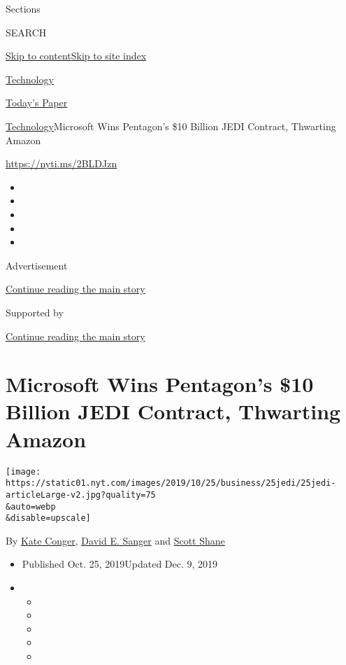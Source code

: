 Sections

SEARCH

\protect\hyperlink{site-content}{Skip to
content}\protect\hyperlink{site-index}{Skip to site index}

\href{https://www.nytimes.com/section/technology}{Technology}

\href{https://myaccount.nytimes.com/auth/login?response_type=cookie\&client_id=vi}{}

\href{https://www.nytimes.com/section/todayspaper}{Today's Paper}

\href{/section/technology}{Technology}\textbar{}Microsoft Wins
Pentagon's \$10 Billion JEDI Contract, Thwarting Amazon

\url{https://nyti.ms/2BLDJzn}

\begin{itemize}
\item
\item
\item
\item
\item
\end{itemize}

Advertisement

\protect\hyperlink{after-top}{Continue reading the main story}

Supported by

\protect\hyperlink{after-sponsor}{Continue reading the main story}

\hypertarget{microsoft-wins-pentagons-10-billion-jedi-contract-thwarting-amazon}{%
\section{Microsoft Wins Pentagon's \$10 Billion JEDI Contract, Thwarting
Amazon}\label{microsoft-wins-pentagons-10-billion-jedi-contract-thwarting-amazon}}

\texttt{[image: https://static01.nyt.com/images/2019/10/25/business/25jedi/25jedi-articleLarge-v2.jpg?quality=75\\\&auto=webp\\\&disable=upscale]}

By \href{https://www.nytimes.com/by/kate-conger}{Kate Conger},
\href{https://www.nytimes.com/by/david-e-sanger}{David E. Sanger} and
\href{https://www.nytimes.com/by/scott-shane}{Scott Shane}

\begin{itemize}
\item
  Published Oct. 25, 2019Updated Dec. 9, 2019
\item
  \begin{itemize}
  \item
  \item
  \item
  \item
  \item
  \end{itemize}
\end{itemize}

